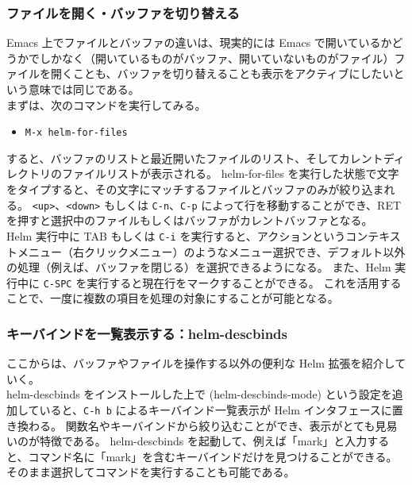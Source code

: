 \subsubsection{ファイルを開く・バッファを切り替える}
Emacs 上でファイルとバッファの違いは、現実的には Emacs で開いているかどうかでしかなく（開いているものがバッファ、開いていないものがファイル）ファイルを開くことも、バッファを切り替えることも表示をアクティブにしたいという意味では同じである。\\

まずは、次のコマンドを実行してみる。
\begin{itemize}\setlength{\leftskip}{-1.00zw}%
\item[] \texttt{M-x helm-for-files}
\end{itemize}
すると、バッファのリストと最近開いたファイルのリスト、そしてカレントディレクトリのファイルリストが表示される。
helm-for-files を実行した状態で文字をタイプすると、その文字にマッチするファイルとバッファのみが絞り込まれる。
\texttt{<up>}、\texttt{<down>} もしくは \texttt{C-n}、\texttt{C-p} によって行を移動することができ、RET を押すと選択中のファイルもしくはバッファがカレントバッファとなる。\\

Helm 実行中に TAB もしくは \texttt{C-i} を実行すると、アクションというコンテキストメニュー（右クリックメニュー）のようなメニュー選択でき、デフォルト以外の処理（例えば、バッファを閉じる）を選択できるようになる。
また、Helm 実行中に \texttt{C-SPC} を実行すると現在行をマークすることができる。
これを活用することで、一度に複数の項目を処理の対象にすることが可能となる。
\subsubsection{キーバインドを一覧表示する：helm-descbinds}
ここからは、バッファやファイルを操作する以外の便利な Helm 拡張を紹介していく。\\

helm-descbinds をインストールした上で (helm-descbinds-mode) という設定を追加していると、\texttt{C-h b} によるキーバインド一覧表示が Helm インタフェースに置き換わる。
関数名やキーバインドから絞り込むことができ、表示がとても見易いのが特徴である。
helm-descbinds を起動して、例えば「mark」と入力すると、コマンド名に「mark」を含むキーバインドだけを見つけることができる。
そのまま選択してコマンドを実行することも可能である。
